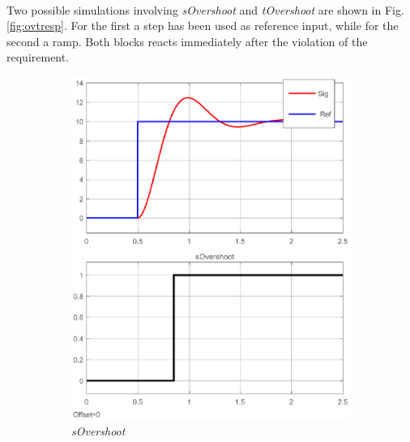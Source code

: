 \paragraph{} Two possible simulations involving \textit{sOvershoot} and \textit{tOvershoot} are shown in Fig.\ref{fig:ovtresp}. For the first a step has been used as reference input, while for the second a ramp. Both blocks reacts immediately after the violation of the requirement.
\begin{figure}[!h]
\centering
\begin{subfigure}[b]{.45\textwidth}
\centering
\includegraphics[width=\textwidth]{Figs/sovsim.eps}
\caption{\textit{sOvershoot}}
\end{subfigure}
\begin{subfigure}[b]{.45\textwidth}
\centering

\end{subfigure}
\end{figure}

